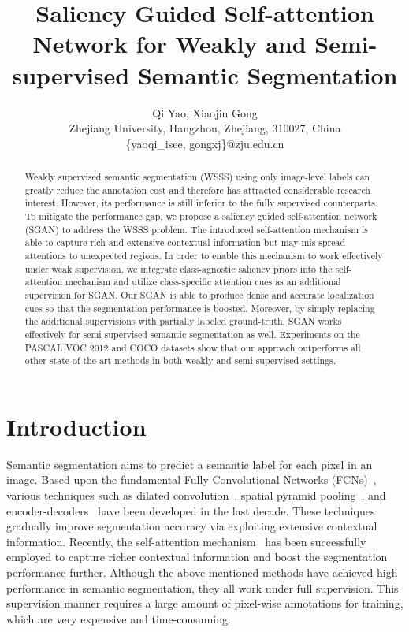 \documentclass[journal]{IEEEtran}
\begin{document}
\title{Saliency Guided Self-attention Network for Weakly and Semi-supervised Semantic Segmentation}



\author{
	Qi Yao, Xiaojin Gong
	\\
	Zhejiang University, Hangzhou, Zhejiang, 310027, China
	\\
	\{yaoqi\_isee, gongxj\}@zju.edu.cn	
}

\maketitle

\begin{abstract}
Weakly supervised semantic segmentation (WSSS) using only image-level labels can greatly reduce the annotation cost and therefore has attracted considerable research interest. However, its performance is still inferior to the fully supervised counterparts. To mitigate the performance gap, we propose a saliency guided self-attention network (SGAN) to address the WSSS problem. The introduced self-attention mechanism is able to capture rich and extensive contextual information but may mis-spread attentions to unexpected regions. In order to enable this mechanism to work effectively under weak supervision, we integrate class-agnostic saliency priors into the self-attention mechanism and utilize class-specific attention cues as an additional supervision for SGAN. Our SGAN is able to produce dense and accurate localization cues so that the segmentation performance is boosted. Moreover, by simply replacing the additional supervisions with partially labeled ground-truth, SGAN works effectively for semi-supervised semantic segmentation as well. Experiments on the PASCAL VOC 2012 and COCO datasets show that our approach outperforms all other state-of-the-art methods in both weakly and semi-supervised settings.
\end{abstract}


\section{Introduction}
\label{sec:introduction}
Semantic segmentation aims to predict a semantic label for each pixel in an image. Based upon the fundamental Fully Convolutional Networks (FCNs)~\cite{Long2015fcn}, various techniques such as dilated convolution~\cite{chen2017deeplab}, spatial pyramid pooling~\cite{Yang2018denseaspp}, and encoder-decoders~\cite{Fischer2015unet} have been developed in the last decade. These techniques gradually improve segmentation accuracy via exploiting extensive contextual information. Recently, the self-attention mechanism~\cite{yuan2018ocnet,fu2019dual,Huang2019criss-cross} has been successfully employed to capture richer contextual information and boost the segmentation performance further. Although the above-mentioned methods have achieved high performance in semantic segmentation, they all work under full supervision. This supervision manner requires a large amount of pixel-wise annotations for training, which are very expensive and time-consuming. 
\end{document}
